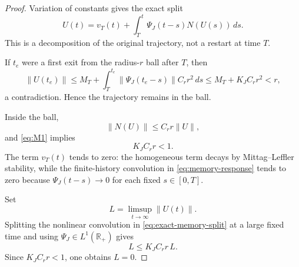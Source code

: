\begin{proof}
Variation of constants gives the exact split
\begin{equation}
  U(t)
  =
  v_T(t)
  +
  \int_T^t
  \Psi_J(t-s)N(U(s))\,ds.
  \label{eq:exact-memory-split}
\end{equation}
This is a decomposition of the original trajectory, not a restart at time \(T\).

If \(t_e\) were a first exit from the radius-\(r\) ball after \(T\), then
\[
  \|U(t_e)\|
  \le
  M_T+
  \int_T^{t_e}
  \|\Psi_J(t_e-s)\|C_rr^2\,ds
  \le
  M_T+K_JC_rr^2<r,
\]
a contradiction. Hence the trajectory remains in the ball.

Inside the ball,
\[
  \|N(U)\|\le C_rr\|U\|,
\]
and \eqref{eq:M1} implies
\[
  K_JC_rr<1.
\]
The term \(v_T(t)\) tends to zero: the homogeneous term decays by Mittag--Leffler stability, while the finite-history convolution in \eqref{eq:memory-response} tends to zero because \(\Psi_J(t-s)\to0\) for each fixed \(s\in[0,T]\).

Set
\[
  L=\limsup_{t\to\infty}\|U(t)\|.
\]
Splitting the nonlinear convolution in \eqref{eq:exact-memory-split} at a large fixed time and using \(\Psi_J\in L^1(\mathbb{R}_+)\) gives
\[
  L\le K_JC_rr\,L.
\]
Since \(K_JC_rr<1\), one obtains \(L=0\).
\end{proof}
